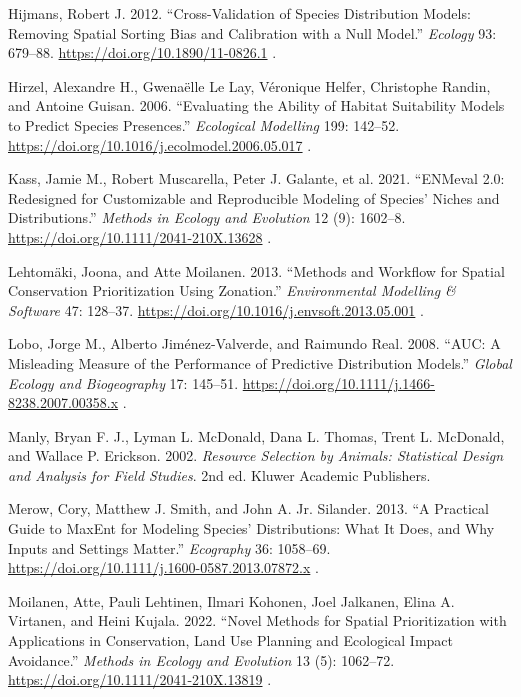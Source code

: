 \documentclass[
  openany]{book}
\makeatletter
\newlength{\cslhangindent}
\newenvironment{CSLReferences}[2] %
 {\begin{list}{}{%
  \setlength{\itemindent}{0pt}
  \setlength{\leftmargin}{0pt}
  \setlength{\parsep}{0pt}
  \ifodd #1
   \setlength{\leftmargin}{\cslhangindent}
   \setlength{\itemindent}{-1\cslhangindent}
  \fi
  \setlength{\itemsep}{#2\baselineskip}}}
 {\end{list}}
\def\uline#1{#1}
\DeclareRobustCommand{\EGV@ulineblue}[1]{%
  \begingroup
  \color{linkblue}\uline{#1}%
  \endgroup
}
\let\EGV@oldurl\url
\renewcommand{\url}[1]{%
  \EGV@ulineblue{\EGV@oldurl{#1}}%
}
\makeatother
\begin{document}
\begin{CSLReferences}{1}{1}
Hijmans, Robert J. 2012. {``Cross-Validation of Species Distribution Models: Removing Spatial Sorting Bias and Calibration with a Null Model.''} \emph{Ecology} 93: 679--88. \url{https://doi.org/10.1890/11-0826.1}.

Hirzel, Alexandre H., Gwenaëlle Le Lay, Véronique Helfer, Christophe Randin, and Antoine Guisan. 2006. {``Evaluating the Ability of Habitat Suitability Models to Predict Species Presences.''} \emph{Ecological Modelling} 199: 142--52. \url{https://doi.org/10.1016/j.ecolmodel.2006.05.017}.

Kass, Jamie M., Robert Muscarella, Peter J. Galante, et al. 2021. {``ENMeval 2.0: Redesigned for Customizable and Reproducible Modeling of Species' Niches and Distributions.''} \emph{Methods in Ecology and Evolution} 12 (9): 1602--8. \url{https://doi.org/10.1111/2041-210X.13628}.

Lehtomäki, Joona, and Atte Moilanen. 2013. {``Methods and Workflow for Spatial Conservation Prioritization Using Zonation.''} \emph{Environmental Modelling \& Software} 47: 128--37. \url{https://doi.org/10.1016/j.envsoft.2013.05.001}.

Lobo, Jorge M., Alberto Jiménez-Valverde, and Raimundo Real. 2008. {``AUC: A Misleading Measure of the Performance of Predictive Distribution Models.''} \emph{Global Ecology and Biogeography} 17: 145--51. \url{https://doi.org/10.1111/j.1466-8238.2007.00358.x}.

Manly, Bryan F. J., Lyman L. McDonald, Dana L. Thomas, Trent L. McDonald, and Wallace P. Erickson. 2002. \emph{Resource Selection by Animals: Statistical Design and Analysis for Field Studies}. 2nd ed. Kluwer Academic Publishers.

Merow, Cory, Matthew J. Smith, and John A. Jr. Silander. 2013. {``A Practical Guide to MaxEnt for Modeling Species' Distributions: What It Does, and Why Inputs and Settings Matter.''} \emph{Ecography} 36: 1058--69. \url{https://doi.org/10.1111/j.1600-0587.2013.07872.x}.

Moilanen, Atte, Pauli Lehtinen, Ilmari Kohonen, Joel Jalkanen, Elina A. Virtanen, and Heini Kujala. 2022. {``Novel Methods for Spatial Prioritization with Applications in Conservation, Land Use Planning and Ecological Impact Avoidance.''} \emph{Methods in Ecology and Evolution} 13 (5): 1062--72. \url{https://doi.org/10.1111/2041-210X.13819}.


\end{CSLReferences}
\end{document}
